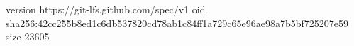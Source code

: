 version https://git-lfs.github.com/spec/v1
oid sha256:42cc255b8ed1c6db537820cd78ab1c84ff1a729c65e96ae98a7b5bf725207e59
size 23605

